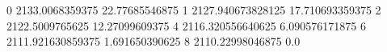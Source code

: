 0 2133.0068359375 22.77685546875
1 2127.940673828125 17.710693359375
2 2122.5009765625 12.27099609375
4 2116.320556640625 6.090576171875
6 2111.921630859375 1.691650390625
8 2110.22998046875 0.0
